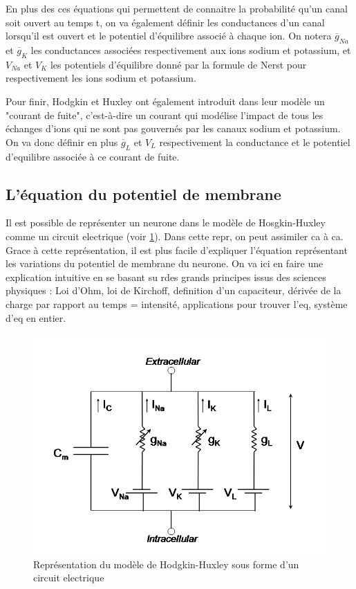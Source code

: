 \documentclass[12pt]{scrartcl}
\begin{document}
En plus des ces équations qui permettent de connaitre la probabilité qu'un canal soit ouvert au temps t, on va également définir les conductances d'un canal lorsqu'il est ouvert et le potentiel d'équilibre associé à chaque ion. On notera $\overline{g}_{Na}$ et $\overline{g}_K$ les conductances associées respectivement aux ions sodium et potassium, et $V_{Na}$ et $V_K$ les potentiels d'équilibre donné par la formule de Nerst pour respectivement les ions sodium et potassium.

Pour finir, Hodgkin et Huxley ont également introduit dans leur modèle un "courant de fuite", c'est-à-dire un courant qui modélise l'impact de tous les échanges d'ions qui ne sont pas gouvernés par les canaux sodium et potassium. On va donc définir en plus $\overline{g}_L$ et $V_L$ respectivement la conductance et le potentiel d'equilibre associée à ce courant de fuite.

\pagebreak
	\subsection{L'équation du potentiel de membrane}
Il est possible de représenter un neurone dans le modèle de Hosgkin-Huxley comme un circuit electrique (voir \ref{HHFIG}). Dans cette repr, on peut assimiler ca à ca. Grace à cette représentation, il est plus facile d'expliquer l'équation représentant les variations du potentiel de membrane du neurone. On va ici en faire une explication intuitive en se basant su rdes grands principes issus des sciences physiques : Loi d'Ohm, loi de Kirchoff, definition d'un capaciteur, dérivée de la charge par rapport au temps = intensité, applications pour trouver l'eq, système d'eq en entier.

\begin{figure}[!h]
\centering
\includegraphics[scale=0.5]{imgs/3.png}
\caption{Représentation du modèle de Hodgkin-Huxley sous forme d'un circuit electrique}
\label{HHFIG}
\end{figure}
\end{document}
